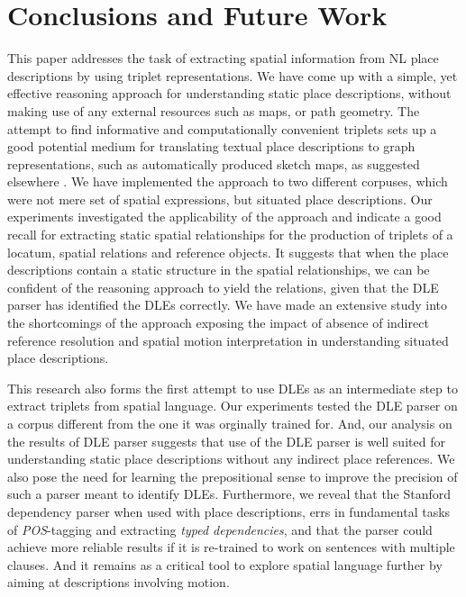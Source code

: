 \documentclass{acm_proc_article-sp}
\begin{document}
\section{Conclusions and Future Work}
\label{sec:conclusion}
This paper addresses the task of extracting spatial information from NL place descriptions by using triplet representations. We have come up with a simple, yet effective reasoning approach for understanding static place descriptions, without making use of any external resources such as maps, or path geometry. The attempt to find informative and computationally convenient triplets sets up a good potential medium for translating textual place descriptions to graph representations, such as automatically produced sketch maps, as suggested elsewhere \cite{maria:descriptions}. We have implemented the approach to two different corpuses, which were not mere set of spatial expressions, but situated place descriptions. Our experiments investigated the applicability of the approach and indicate a good recall for extracting static spatial relationships for the production of triplets of a locatum, spatial relations and reference objects. It suggests that when the place descriptions contain a static structure in the spatial relationships, we can be confident of the reasoning approach to yield the relations, given that the DLE parser has identified the DLEs correctly. We have made an extensive study into the shortcomings of the approach exposing the impact of absence of indirect reference resolution and spatial motion interpretation in understanding situated place descriptions. 

This research also forms the first attempt to use DLEs as an intermediate step to extract triplets from spatial language. Our experiments tested the DLE parser on a corpus different from the one it was orginally trained for. And, our analysis on the results of DLE parser suggests that use of the DLE parser is well suited for understanding static place descriptions without any indirect place references. We also pose the need for learning the prepositional sense to improve the precision of such a parser meant to identify DLEs. Furthermore, we reveal that the Stanford dependency parser when used with place descriptions, errs in fundamental tasks of \textit{POS}-tagging and extracting \textit{typed dependencies}, and that the parser could achieve more reliable results if it is re-trained to work on sentences with multiple clauses. And it remains as a critical tool to explore spatial language further by aiming at descriptions involving motion.
\end{document}
